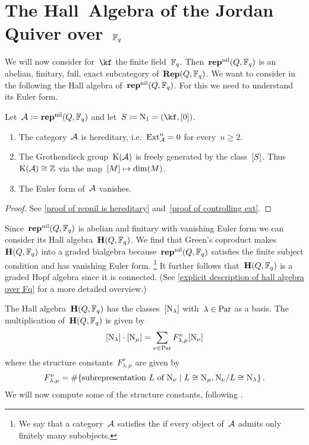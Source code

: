 \documentclass[a4paper,11pt]{scrartcl}
\begin{document}
\section{The Hall~Algebra of the Jordan Quiver over~$\mathbb{F}_q$}

We will now consider for~$\kf$ the finite field~$\mathbb{F}_q$.
Then~$\mathbf{rep}^{\mathrm{nil}}(Q, \mathbb{F}_q)$ is an abelian, finitary, full, exact subcategory of~$\mathbf{Rep}(Q, \mathbb{F}_q)$.
We want to consider in the following the Hall algebra of~$\mathbf{rep}^{\mathrm{nil}}(Q, \mathbb{F}_q)$.
For this we need to understand its Euler form.

\begin{proposition}
  Let~$\mathcal{A} \coloneqq \mathbf{rep}^{\mathrm{nil}}(Q, \mathbb{F}_q)$ and let~$S \defined \Nil_1 = (\kf, [0])$.
  \begin{enumerate}
    \item
      The category~$\mathcal{A}$ is hereditary, i.e.~$\operatorname{Ext}^n_{\mathcal{A}} = 0$ for every~$n \geq 2$.
    \item
      The Grothendieck group~$\operatorname{K}(\mathcal{A})$ is freely generated by the class~$[S]$.
      Thus~$\operatorname{K}(\mathcal{A}) \cong \mathbb{Z}$ via the map~$[M] \mapsto \dim(M)$.
    \item
      The Euler form of~$\mathcal{A}$ vanishes.
  \end{enumerate}
\end{proposition}

\begin{proof}
  See \cref{proof of repnil is hereditary} and~\cref{proof of controlling ext}.
\end{proof}

Since~$\mathbf{rep}^{\mathrm{nil}}(Q, \mathbb{F}_q)$ is abelian and finitary with vanishing Euler form we can consider its Hall algebra~$\mathbf{H}(Q, \mathbb{F}_q)$.
We find that Green’s coproduct makes~$\mathbf{H}(Q, \mathbb{F}_q)$ into a graded bialgebra because~$\mathbf{rep}^{\mathrm{nil}}(Q, \mathbb{F}_q)$ satisfies the finite subject condition and has vanishing Euler form.%
\footnote{%
  We say that a category~$\mathcal{A}$ satisfies the  if every object of~$\mathcal{A}$ admits only finitely many subobjects.
}
It further follows that~$\mathbf{H}(Q, \mathbb{F}_q)$ is a graded Hopf algebra since it is connected.
(See \cref{explicit description of hall algebra over Fq} for a more detailed overview.)

The Hall algebra~$\mathbf{H}(Q, \mathbb{F}_q)$ has the classes~$[\mathrm{N}_\lambda]$ with~$\lambda \in \mathrm{Par}$ as a basis.
The multiplication of~$\mathbf{H}(Q, \mathbb{F}_q)$ is given by
\[
  [\mathrm{N}_\lambda] \cdot [\mathrm{N}_\mu]
  =
  \sum_{\nu \in \mathrm{Par}}
  F^\nu_{\lambda, \mu} [\mathrm{N}_\nu]
\]
where the structure constants~$F^\nu_{\lambda, \mu}$ are given by
\[
  F^\nu_{\lambda, \mu}
  =
  \counting
  \{
    \text{subrepresentation~$L$ of~$\Nil_\nu$}
  \suchthat
    L \cong \Nil_\mu,
    \Nil_\nu/L \cong \Nil_\lambda
  \} \,.
\]
We will now compute some of the structure constants, following \cite[Example~2.2]{schiffmann_hall}.
\end{document}
